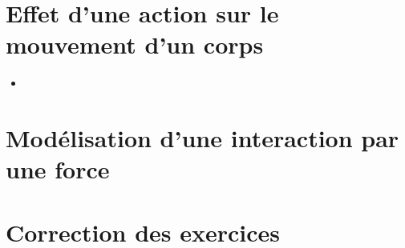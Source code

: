 \documentclass[12pt,a4paper]{article}
\date{}
\title{}
\begin{document}
	
	

\section{Effet d'une action sur le mouvement d'un corps}








\begin{myexos}
	\begin{itemize}
		\item 
	\end{itemize}
\end{myexos}

\newpage
\section{Modélisation d'une interaction par une force}

%

%

\appendix

\newpage

\section*{Correction des exercices}
\end{document}
